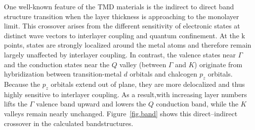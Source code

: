 One well-known feature of the TMD materials is the indirect to direct band structure transition when the layer thickness is approaching to the monolayer limit\cite{Mak2010-dq}.
This crossover arises from the different sensitivity of electronic states at distinct wave vectors to interlayer coupling and quantum confinement\cite{Splendiani2010-km}.
At the k points, states are strongly localized around the metal atoms and therefore remain largely unaffected by interlayer coupling. 
In contrast, the valence states near $\Gamma$ and the conduction states near the $Q$ valley (between $\Gamma$ and $K$) originate from hybridization between transition-metal $d$ orbitals 
and chalcogen $p_z$ orbitals. 
Because the $p_z$ orbitals extend out of plane, they are more 
delocalized and thus highly sensitive to interlayer coupling. 
As a result,with increasing layer numbers lifts the $\Gamma$ valence band upward and lowers the $Q$ conduction band, while the $K$ valleys remain nearly unchanged.
Figure~\ref{fig.band} shows this direct–indirect crossover in the calculated bandstructures.

